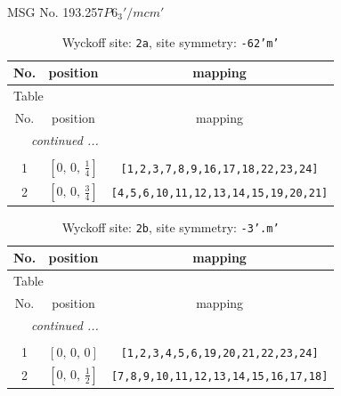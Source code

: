 \documentclass[fleqn,8pt]{jsarticle}
\begin{document}
\setcounter{MaxMatrixCols}{32}

\renewcommand{\tablename}{Table~}
\renewcommand{\figurename}{Figure~}
\begin{center}
\LARGE
MSG No. 193.257\quad$P6_{3}'/mcm'$
\end{center}
\renewcommand{\arraystretch}{1.2}
\begin{longtable}{ccc}
\caption{Wyckoff site: {\tt 2a}, site symmetry: {\tt -62'm'}}
 \\
 \hline \hline
No. & position & mapping \\ \hline \endfirsthead

\multicolumn{2}{l}{\tablename\ \thetable{}} \\
 \hline \hline
No. & position & mapping \\ \hline \endhead

 \hline \hline
\multicolumn{2}{r}{\footnotesize\it continued ...} \\ \endfoot

 \hline \hline
\multicolumn{2}{r}{} \\ \endlastfoot

1 & $\left[ 0,\, 0,\, \frac{1}{4} \right]$ & {\tt [1,2,3,7,8,9,16,17,18,22,23,24]} \\ \hline
2 & $\left[ 0,\, 0,\, \frac{3}{4} \right]$ & {\tt [4,5,6,10,11,12,13,14,15,19,20,21]} \\
\end{longtable}
\renewcommand{\arraystretch}{1.2}
\begin{longtable}{ccc}
\caption{Wyckoff site: {\tt 2b}, site symmetry: {\tt -3'.m'}}
 \\
 \hline \hline
No. & position & mapping \\ \hline \endfirsthead

\multicolumn{2}{l}{\tablename\ \thetable{}} \\
 \hline \hline
No. & position & mapping \\ \hline \endhead

 \hline \hline
\multicolumn{2}{r}{\footnotesize\it continued ...} \\ \endfoot

 \hline \hline
\multicolumn{2}{r}{} \\ \endlastfoot

1 & $\left[ 0,\, 0,\, 0 \right]$ & {\tt [1,2,3,4,5,6,19,20,21,22,23,24]} \\ \hline
2 & $\left[ 0,\, 0,\, \frac{1}{2} \right]$ & {\tt [7,8,9,10,11,12,13,14,15,16,17,18]} \\
\end{longtable}
\end{document}
